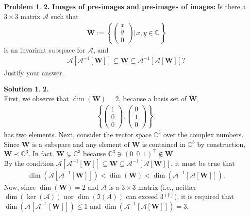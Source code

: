 \documentclass{article}
\theoremstyle{definition}
\newtheorem*{prob*}{Problem}
\newtheorem*{sln*}{Solution}
\newcommand{\W}{\mathbf{W}}
\begin{document}
\newpage
\begin{prob*}\textbf{2.}
	\textbf{Images of pre-images and pre-images of images:} Is there a $3\times 3$ matrix $\mathcal{A}$ such that
	\begin{align*}
	\W := \left\{ \begin{pmatrix}
	x\\y\\0
	\end{pmatrix}\bigg\vert \,x,y\in \mathbb{C} \right\}
	\end{align*}
	is an invariant subspace for $\mathcal{A}$, and
	\begin{align*}
	\mathcal{A}\left[ \mathcal{A}^{-1}[\W] \right] \subsetneq \W \subsetneq \mathcal{A}^{-1}\left[ \mathcal{A}[\W] \right]?
	\end{align*}
	Justify your answer.
	
	
	\begin{sln*}\textbf{2.}
		$\,$\\
		
		\noindent First, we observe that $\dim(\W) = 2$, because a basis set of $\W$,
		\begin{align*}
		\left\{ \begin{pmatrix}
		1\\0\\0
		\end{pmatrix},\begin{pmatrix}
		0\\1\\0
		\end{pmatrix}\right\},
		\end{align*}
		has two elements. Next, consider the vector space $\mathbb{C}^3$ over the complex numbers. Since $\W$ is a subspace and any element of $\W$ is contained in $\mathbb{C}^3$ by construction, $\W \prec \mathbb{C}^3$. In fact, $\W \subsetneq \mathbb{C}^3$ because $\mathbb{C}^3 \ni (0\,\,\,0\,\,\,1)^\top \notin\W$\\
		
		\noindent By the condition $\mathcal{A}\left[ \mathcal{A}^{-1}[\W] \right] \subsetneq \W \subsetneq \mathcal{A}^{-1}\left[ \mathcal{A}[\W] \right]$, it must be true that
		\begin{align*}
		\dim\left( \mathcal{A}\left[ \mathcal{A}^{-1}[\W] \right]   \right) < \dim(\W) < \dim\left(\mathcal{A}^{-1}\left[ \mathcal{A}[\W] \right]\right).
		\end{align*}
		Now, since $\dim(\W) = 2$ and $\mathcal{A}$ is a $3\times 3$ matrix (i.e., neither $\dim(\ker(\mathcal{A}))$ nor $\dim(\Im(A))$ can exceed 3$^{(\dagger)}$), it is required that $\dim\left( \mathcal{A}\left[ \mathcal{A}^{-1}[\W] \right]   \right) \leq 1$ and $\dim\left(\mathcal{A}^{-1}\left[ \mathcal{A}[\W] \right]\right) = 3$. \\
		

\end{sln*}
\end{prob*}
\end{document}
